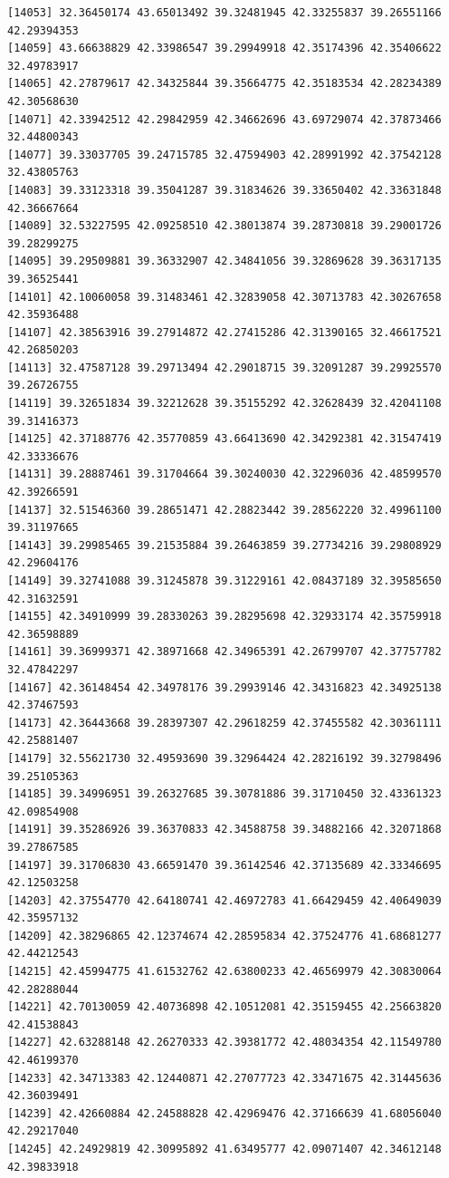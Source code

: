 \documentclass[
  letterpaper,
  DIV=11,
  numbers=noendperiod]{scrartcl}
\begin{document}
\begin{verbatim}
[14053] 32.36450174 43.65013492 39.32481945 42.33255837 39.26551166 42.29394353
[14059] 43.66638829 42.33986547 39.29949918 42.35174396 42.35406622 32.49783917
[14065] 42.27879617 42.34325844 39.35664775 42.35183534 42.28234389 42.30568630
[14071] 42.33942512 42.29842959 42.34662696 43.69729074 42.37873466 32.44800343
[14077] 39.33037705 39.24715785 32.47594903 42.28991992 42.37542128 32.43805763
[14083] 39.33123318 39.35041287 39.31834626 39.33650402 42.33631848 42.36667664
[14089] 32.53227595 42.09258510 42.38013874 39.28730818 39.29001726 39.28299275
[14095] 39.29509881 39.36332907 42.34841056 39.32869628 39.36317135 39.36525441
[14101] 42.10060058 39.31483461 42.32839058 42.30713783 42.30267658 42.35936488
[14107] 42.38563916 39.27914872 42.27415286 42.31390165 32.46617521 42.26850203
[14113] 32.47587128 39.29713494 42.29018715 39.32091287 39.29925570 39.26726755
[14119] 39.32651834 39.32212628 39.35155292 42.32628439 32.42041108 39.31416373
[14125] 42.37188776 42.35770859 43.66413690 42.34292381 42.31547419 42.33336676
[14131] 39.28887461 39.31704664 39.30240030 42.32296036 42.48599570 42.39266591
[14137] 32.51546360 39.28651471 42.28823442 39.28562220 32.49961100 39.31197665
[14143] 39.29985465 39.21535884 39.26463859 39.27734216 39.29808929 42.29604176
[14149] 39.32741088 39.31245878 39.31229161 42.08437189 32.39585650 42.31632591
[14155] 42.34910999 39.28330263 39.28295698 42.32933174 42.35759918 42.36598889
[14161] 39.36999371 42.38971668 42.34965391 42.26799707 42.37757782 32.47842297
[14167] 42.36148454 42.34978176 39.29939146 42.34316823 42.34925138 42.37467593
[14173] 42.36443668 39.28397307 42.29618259 42.37455582 42.30361111 42.25881407
[14179] 32.55621730 32.49593690 39.32964424 42.28216192 39.32798496 39.25105363
[14185] 39.34996951 39.26327685 39.30781886 39.31710450 32.43361323 42.09854908
[14191] 39.35286926 39.36370833 42.34588758 39.34882166 42.32071868 39.27867585
[14197] 39.31706830 43.66591470 39.36142546 42.37135689 42.33346695 42.12503258
[14203] 42.37554770 42.64180741 42.46972783 41.66429459 42.40649039 42.35957132
[14209] 42.38296865 42.12374674 42.28595834 42.37524776 41.68681277 42.44212543
[14215] 42.45994775 41.61532762 42.63800233 42.46569979 42.30830064 42.28288044
[14221] 42.70130059 42.40736898 42.10512081 42.35159455 42.25663820 42.41538843
[14227] 42.63288148 42.26270333 42.39381772 42.48034354 42.11549780 42.46199370
[14233] 42.34713383 42.12440871 42.27077723 42.33471675 42.31445636 42.36039491
[14239] 42.42660884 42.24588828 42.42969476 42.37166639 41.68056040 42.29217040
[14245] 42.24929819 42.30995892 41.63495777 42.09071407 42.34612148 42.39833918

\end{verbatim}
\end{document}
